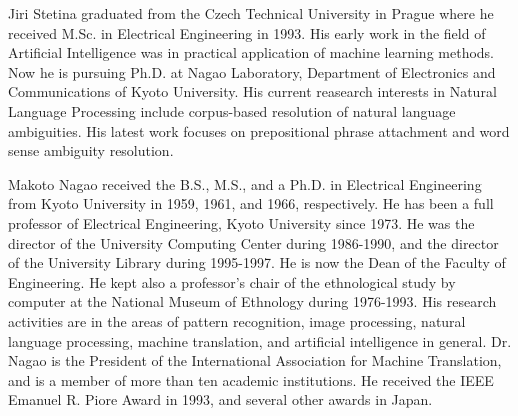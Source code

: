 \begin{biography}

\biotitle{}

{
Jiri Stetina graduated from the Czech Technical University in Prague
where he received M.Sc. in Electrical Engineering in 1993. His early
work in the field of Artificial Intelligence was in practical
application of machine learning methods. Now he is pursuing Ph.D. at
Nagao Laboratory, Department of Electronics and Communications of
Kyoto University. His current reasearch interests in Natural Language
Processing include corpus-based resolution of natural language
ambiguities. His latest work focuses on prepositional phrase
attachment and word sense ambiguity resolution.
}

{
Makoto Nagao received the B.S., M.S., and a Ph.D. in Electrical
Engineering from Kyoto University in 1959, 1961, and 1966,
respectively. He has been a full professor of Electrical Engineering,
Kyoto University since 1973. He was the director of the University
Computing Center during 1986-1990, and the director of the University
Library during 1995-1997. He is now the Dean of the Faculty of
Engineering. He kept also a professor's chair of the ethnological
study by computer at the National Museum of Ethnology during
1976-1993. His research activities are in the areas of pattern
recognition, image processing, natural language processing, machine
translation, and artificial intelligence in general. Dr. Nagao is the
President of the International Association for Machine Translation,
and is a member of more than ten academic institutions. He received
the IEEE Emanuel R. Piore Award in 1993, and several other awards in
Japan.
}


\end{biography}



